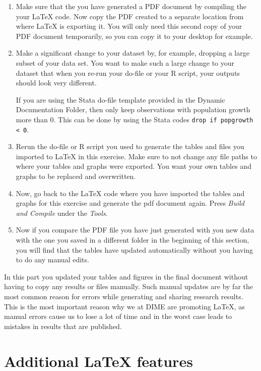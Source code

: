 \documentclass[12pts]{article}
\begin{document}
	\begin{enumerate}
		\item Make sure that the you have generated a PDF document by compiling the your {\LaTeX} code. Now copy the PDF created to a separate location from where {\LaTeX} is exporting it. You will only need this second copy of your PDF document temporarily, so you can copy it to your desktop for example. 
		\item Make a significant change to your dataset by, for example, dropping a large subset of your data set. You want to make such a large change to your dataset that when you re-run your do-file or your R script, your outputs should look very different.
		
		If you are using the Stata do-file template provided in the Dynamic Documentation Folder, then only keep observations with population growth more than 0. This can be done by using the Stata codes \texttt{drop if popgrowth < 0}. 
		\item Rerun the do-file or R script you used to generate the tables and files you imported to {\LaTeX} in this exercise. Make sure to not change any file paths to where your tables and graphs were exported. You want your own tables and graphs to be replaced and overwritten.
		\item Now, go back to the {\LaTeX} code where you have imported the tables and graphs for this exercise and generate the pdf document again. Press \textit{Build and Compile} under the \textit{Tools}.
		\item Now if you compare the PDF file you have just generated with you new data with the one you saved in a different folder in the beginning of this section, you will find that the tables have updated automatically without you having to do any manual edits. 
	\end{enumerate}
	
	In this part you updated your tables and figures in the final document without having to copy any results or files manually. Such manual updates are by far the most common reason for errors while generating and sharing research results. This is the most important reason why we at DIME are promoting {\LaTeX}, as manual errors cause us to lose a lot of time and in the worst case leads to mistakes in results that are published.
	
	\section{Additional {\LaTeX} features}
	
\end{document}
